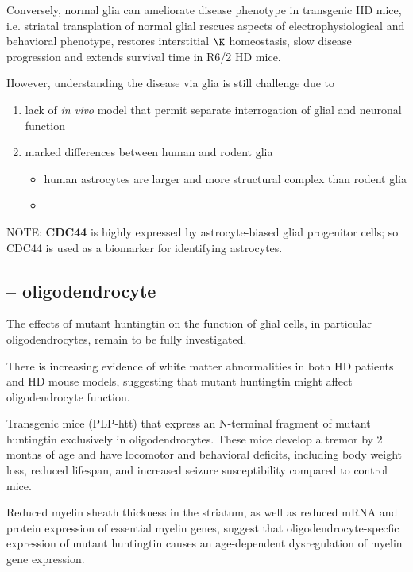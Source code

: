 Conversely, normal glia can ameliorate disease phenotype in transgenic HD mice,
i.e. striatal transplation of normal glial rescues aspects of
electrophysiological and behavioral phenotype, restores interstitial $\K$
homeostasis, slow disease progression and extends survival time in R6/2 HD mice.

However, understanding the disease via glia is still challenge due to
\begin{enumerate}
  \item lack of {\it in vivo} model that permit separate interrogation of glial
  and neuronal function
  
  \item marked differences between human and rodent glia
  \begin{itemize}
    \item human astrocytes are larger and more structural complex than rodent
    glia
    
    \item 
  \end{itemize}
\end{enumerate}

NOTE: {\bf CDC44} is highly expressed by astrocyte-biased glial progenitor
cells; so CDC44 is used as a biomarker for identifying astrocytes. 

\subsection{-- oligodendrocyte}
\label{sec:oligodendrocyte-in-HD}

The effects of mutant huntingtin on the function of glial cells, in
particular oligodendrocytes, remain to be fully investigated.

There is increasing evidence of white matter abnormalities in both HD patients
and HD mouse models, suggesting that mutant huntingtin might affect
oligodendrocyte function.

Transgenic mice (PLP-htt) that express an N-terminal fragment of mutant
huntingtin exclusively in oligodendrocytes. These mice develop a tremor by 2
months of age and have locomotor and behavioral deficits, including body weight
loss, reduced lifespan, and increased seizure susceptibility compared to control
mice.

Reduced myelin sheath thickness in the striatum, as well as reduced mRNA and
protein expression of essential myelin genes, suggest that
oligodendrocyte-specfic expression of mutant huntingtin causes an age-dependent
dysregulation of myelin gene expression.

